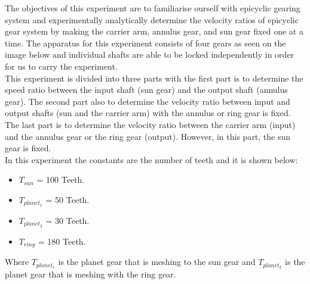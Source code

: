 The objectives of this experiment are to familiarise ourself with epicyclic gearing system and experimentally analytically determine the velocity ratios of epicyclic gear system by making the carrier arm, annulus gear, and sun gear fixed one at a time. The apparatus for this experiment consists of four gears as seen on the image below and individual shafts are able to be locked independently in order for us to carry the experiment. \\

This experiment is divided into three parts with the first part is to determine the speed ratio between the input shaft (sun gear) and the output shaft (annulus gear). The second part also to determine the velocity ratio between input and output shafts (sun and the carrier arm) with the annulus or ring gear is fixed. The last part is to determine the velocity ratio between the carrier arm (input) and the annulus gear or the ring gear (output). However, in this part, the sun gear is fixed. \\

In this experiment the constants are the number of teeth and it is shown below:
\begin{itemize}
\item $T_{sun}$ = 100 Teeth.
\item $T_{planet_1}$ = 50 Teeth.
\item $T_{planet_2}$ = 30 Teeth.
\item $T_{ring}$ = 180 Teeth.
\end{itemize}
Where $T_{planet_1}$ is the planet gear that is meshing to the sun gear and $T_{planet_2}$ is the planet gear that is meshing with the ring gear.